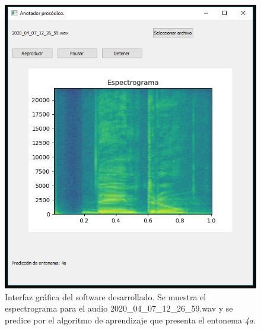 \begin{figure}
\begin{center}
\includegraphics[width= 1\columnwidth]{Graphics/software2}
\caption{Interfaz gr\'afica del software desarrollado. Se muestra el espectrograma para el audio 2020\_04\_07\_12\_26\_59.wav y se predice por el algoritmo de aprendizaje que presenta el entonema \emph{4a}.}
\label{software2}
\end{center}
\end{figure}